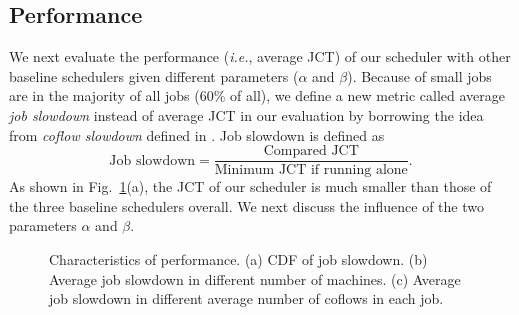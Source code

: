 \documentclass[10pt, conference, letterpaper]{IEEEtran}
\begin{document}
\subsection{Performance}
We next evaluate the performance (\emph{i.e.}, average JCT) of our scheduler with other baseline schedulers given different parameters ($\alpha$ and $\beta$). Because of small jobs are in the majority of all jobs (60\% of all), %
we define a new metric called average \emph{job slowdown} instead of average JCT in our evaluation by borrowing the idea from \emph{coflow slowdown} defined in \cite{utopia}. Job slowdown is defined as
\[\text{Job slowdown} = \frac{\text{Compared JCT}}{\text{Minimum JCT if running alone}}.\]
As shown in Fig.~\ref{f2}(a), the JCT of our scheduler is much smaller than those of the three baseline schedulers overall. We next discuss the influence of the two parameters $\alpha$ and $\beta$.

\begin{figure}[!t]
	\centering
	\hfil
	\hfil
	\caption{Characteristics of performance. (a) CDF of job slowdown. (b) Average job slowdown in different number of machines. (c) Average job slowdown in different average number of coflows in each job.}
	\label{f2}
\end{figure}
\end{document}
